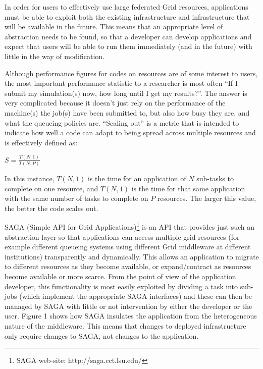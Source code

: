 \documentclass[a4paper,10pt,twocolumn]{article}
\begin{document}
In order for users to effectively use large federated Grid resources, applications must be able to exploit both the existing infrastructure and infrastructure that will be available in the future.  This means that an appropriate level of abstraction needs to be found, so that a developer can develop applications and expect that users will be able to run them immediately (and in the future) with little in the way of modification.  

Although performance figures for codes on resources are of some interest to users, the most important performance statistic to a researcher is most often ``If I submit my simulation(s) now, how long until I get my results?''.  The answer is very complicated because it doesn't just rely on the performance of the machine(s) the job(s) have been submitted to, but also how busy they are, and what the queueing policies are.  ``Scaling out'' is a metric that is intended to indicate how well a code can adapt to being spread across multiple resources and is effectively defined as:

 \begin{center} \begin{math} S = \frac{T(N,1)}{T(N,P)} \end{math} \end{center}

In this instance, $T(N,1)$ is the time for an application of $N$ sub-tasks to complete on one resource, and $T(N,1)$ is the time for that same application with the same number of tasks to complete on $P$ resources.  The larger this value, the better the code scales out.


SAGA (Simple API for Grid Applications)\footnote{SAGA web-site: http://saga.cct.lsu.edu/} is an API that provides just such an abstraction layer so that applications can access multiple grid resources (for example different queueing systems using different Grid middleware at different institutions) transparently and dynamically.  This allows an application to migrate to different resources as they become available, or expand/contract as resources become available or more scarce.  From the point of view of the application developer, this functionality is most easily exploited by dividing a task into sub-jobs (which implement the appropriate SAGA interfaces) and these can then be managed by SAGA with little or not intervention by either the developer or the user.  Figure 1 shows how SAGA insulates the application from the heterogeneous nature of the middleware.  This means that changes to deployed infrastructure only require changes to SAGA, not changes to the application.
\end{document}

